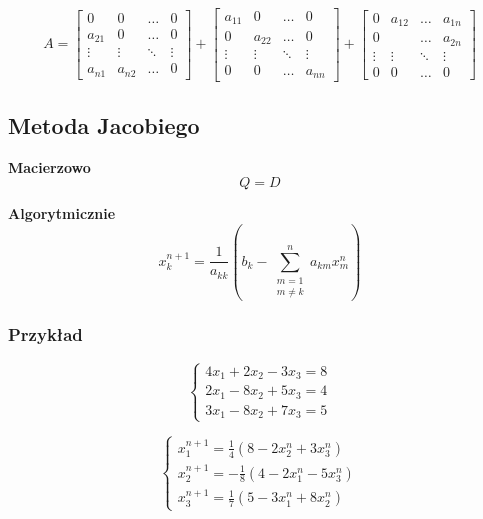 \documentclass[../mn-notatki.tex]{subfiles}
\begin{document}
\[
A
=
\begin{bmatrix}
0      & 0      & \ldots & 0\\
a_{21} & 0      & \ldots & 0\\
\vdots & \vdots & \ddots & \vdots\\
a_{n1} & a_{n2} & \ldots & 0
\end{bmatrix}
+
\begin{bmatrix}
a_{11} & 0      & \ldots & 0\\
0      & a_{22} & \ldots & 0\\
\vdots & \vdots & \ddots & \vdots\\
0      & 0      & \ldots & a_{nn}
\end{bmatrix}
+
\begin{bmatrix}
0      & a_{12} & \ldots & a_{1n}\\
0      &        & \ldots & a_{2n}\\
\vdots & \vdots & \ddots & \vdots\\
0      & 0      & \ldots & 0
\end{bmatrix}
\]


\subsection{Metoda Jacobiego}
\begin{tcolorbox}
\textbf{Macierzowo}
\[
Q = D
\]
\end{tcolorbox}

\begin{tcolorbox}
\textbf{Algorytmicznie}
\[
x_k^{n+1} = \frac{1}{a_{kk}} \left(b_k - \sum^{n}_{\substack{m=1 \\ m\neq k}}
a_{km} x_m^n \right)
\]
\end{tcolorbox}

\subsubsection{Przykład}
\begin{table}[!htb]
    \begin{minipage}{.5\linewidth}
\[
\begin{cases}
4x_1 + 2x_2 - 3x_3 = 8\\
2x_1  - 8x_2 + 5x_3 = 4\\
3x_1 - 8x_2 + 7x_3 = 5
\end{cases}
\]
    \end{minipage}%
    \begin{minipage}{.5\linewidth}
\[
\begin{cases}
x_1^{n+1} =  \frac{1}{4} ( 8 - 2x_2^n + 3x_3^n  ) \\
x_2^{n+1} = -\frac{1}{8} ( 4 - 2x_1^n - 5x_3^n  ) \\
x_3^{n+1} =  \frac{1}{7} ( 5 - 3x_1^n + 8x_2^n  )
\end{cases}
\]
    \end{minipage}%
\end{table}
\end{document}
